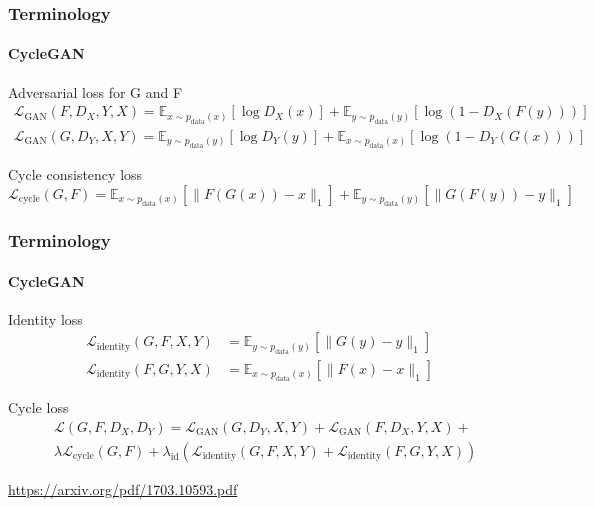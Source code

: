 \documentclass[aspectratio=169, lecture, amberg]{OTHAWbeamer}
\begin{document}
\begin{frame}
    \frametitle{Terminology}
    \framesubtitle{CycleGAN}
    \begin{block}{Adversarial loss for G and F}
        \begin{align}
            \mathcal{L}_{\text{GAN}}(F, D_X, Y, X) = \mathbb{E}_{x \sim p_{\text{data}}(x)} [\log D_X(x)] + \mathbb{E}_{y \sim p_{\text{data}}(y)} [\log(1 - D_X(F(y)))] \\
            \mathcal{L}_{\text{GAN}}(G, D_Y, X, Y) = \mathbb{E}_{y \sim p_{\text{data}}(y)} [\log D_Y(y)] + \mathbb{E}_{x \sim p_{\text{data}}(x)} [\log(1 - D_Y(G(x)))]
        \end{align}
    \end{block}

    \begin{block}{Cycle consistency loss}
        \begin{equation}
        \mathcal{L}_{\text{cycle}}(G, F) = \mathbb{E}_{x \sim p_{\text{data}}(x)} [\lVert F(G(x)) - x \rVert_1] + \mathbb{E}_{y \sim p_{\text{data}}(y)} [\lVert G(F(y)) - y \rVert_1]
        \end{equation}
    \end{block}
\end{frame}
\begin{frame}
    \frametitle{Terminology}
    \framesubtitle{CycleGAN}
    \begin{block}{Identity loss}
        \begin{align}
            \mathcal{L}_{\text{identity}}(G, F, X, Y) & = \mathbb{E}_{y \sim p_{\text{data}}(y)} [\lVert G(y) - y \rVert_1] \\
            \mathcal{L}_{\text{identity}}(F, G, Y, X) & = \mathbb{E}_{x \sim p_{\text{data}}(x)} [\lVert F(x) - x \rVert_1]
        \end{align}
    \end{block}

    \begin{block}{Cycle loss}
        \begin{equation}
            \begin{split}
                &\mathcal{L}(G, F, D_X, D_Y) = \mathcal{L}_{\text{GAN}}(G, D_Y, X, Y) + \mathcal{L}_{\text{GAN}}(F, D_X, Y, X) + \\
                &\lambda \mathcal{L}_{\text{cycle}}(G, F) + \lambda_{\text{id}} \left( \mathcal{L}_{\text{identity}}(G, F, X, Y) + \mathcal{L}_{\text{identity}}(F, G, Y, X) \right)
            \end{split}    
        \end{equation}
    \end{block}
    \tiny{\footnotemark \url{https://arxiv.org/pdf/1703.10593.pdf}}
\end{frame}
\end{document}

